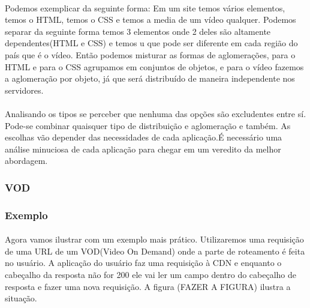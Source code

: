 \paragraph{} Podemos exemplicar da seguinte forma: Em um site temos v\'arios elementos, temos o HTML, temos o CSS e temos a media de um v\'ideo qualquer. Podemos separar da seguinte forma temos 3 elementos onde 2 deles s\~ao altamente dependentes(HTML e CSS) e temos u que pode ser diferente em cada regi\~ao do pa\'is que \'e o v\'ideo. Ent\~ao podemos misturar as formas de aglomera\c{c}\~oes, para o HTML e para o CSS agrupamos em conjuntos de objetos, e para o v\'ideo fazemos a aglomera\c{c}\~ao por objeto, j\'a que ser\'a distribu\'ido de maneira independente nos servidores.

\paragraph{} Analisando os tipos se perceber que nenhuma das op\c{c}\~oes s\~ao excludentes entre s\'i. Pode-se combinar quaisquer tipo de distribui\c{c}\~ao e aglomera\c{c}\~ao e tamb\'em. As escolhas v\~ao depender das necessidades de cada aplica\c{c}\~ao.\'E necess\'ario uma an\'alise minuciosa de cada aplica\c{c}\~ao para chegar em um veredito da melhor abordagem.
\subsubsection{VOD}
\subsubsection{Exemplo}
\paragraph{} Agora vamos ilustrar com um exemplo mais pr\'atico. Utilizaremos uma requisi\c{c}\~ao de uma URL de um VOD(Video On Demand) onde a parte de roteamento \'e feita no usu\'ario. A aplica\c{c}\~ao do usu\'ario faz uma requisi\c{c}\~ao \`a CDN e enquanto o cabe\c{c}alho da resposta n\~ao for 200 ele vai ler um campo dentro do cabe\c{c}alho de resposta e fazer uma nova requisi\c{c}\~ao. A figura (FAZER A FIGURA) ilustra a situa\c{c}\~ao.


